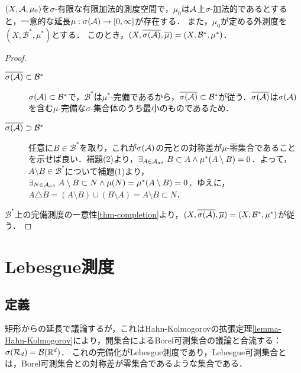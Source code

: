 \documentclass[uplatex, dvipdfmx]{jsreport}
\renewcommand{\B}{\mathcal{B}}
\begin{document}
\begin{theorem}[完備化]\label{thm-complesion-and-extension}
    $(X,\mathcal{A},\mu_0)$を$\sigma$-有限な有限加法的測度空間で，$\mu_0$は$\mathcal{A}$上$\sigma$-加法的であるとすると，一意的な延長$\mu:\sigma(\mathcal{A})\to[0,\infty]$が存在する．
    また，$\mu_0$が定める外測度を$(X,\B^*,\mu^*)$とする．
    このとき，$(X,\o{\sigma(\A)},\o{\mu})=(X,\B^*,\mu^*)$．
\end{theorem}
\begin{proof}\mbox{}
    \begin{description}
        \item[$\o{\sigma(\A)}\subset\B^*$] $\sigma(\A)\subset\B^*$で，$\B^*$は$\mu^*$-完備であるから，$\o{\sigma(\A)}\subset\B^*$が従う．$\overline{\sigma(\mathcal{A})}$は$\sigma(\mathcal{A})$を含む$\mu$-完備な$\sigma$-集合体のうち最小のものであるため．
        \item[$\o{\sigma(\A)}\supset\B^*$] 任意に$B\in\B^*$を取り，これが$\sigma(\mathcal{A})$の元との対称差が$\mu$-零集合であることを示せば良い．補題(2)より，$\exists_{A\in\mathcal{A}_{\sigma\delta}}\;B\subset A\land \mu^*(A\setminus B)=0$．よって，$A\setminus B\in\B^*$について補題(1)より，$\exists_{N\in\mathcal{A}_{\sigma\delta}}\;A\setminus B\subset N\land \mu(N)=\mu^*(A\setminus B)=0$．ゆえに，$A\triangle B=(A\setminus B)\cup(B\setminus A)=A\setminus B\subset N$．
    \end{description}
    $\B^*$上の完備測度の一意性\ref{thm-completion}より，$(X,\o{\sigma(\A)},\o{\mu})=(X,\B^*,\mu^*)$が従う．
\end{proof}


\section{Lebesgue測度}

\subsection{定義}

\begin{tcolorbox}[colframe=ForestGreen, colback=ForestGreen!10!white,breakable,colbacktitle=ForestGreen!40!white,coltitle=black,fonttitle=\bfseries\sffamily,
title=]
    矩形からの延長で議論するが，これはHahn-Kolmogorovの拡張定理\ref{lemma-Hahn-Kolmogorov}により，開集合によるBorel可測集合の議論と合流する：$\sigma(\cR_d)=\B(\R^d)$．
    これの完備化がLebesgue測度であり，Lebesgue可測集合とは，Borel可測集合との対称差が零集合であるような集合である．
\end{tcolorbox}
\end{document}
